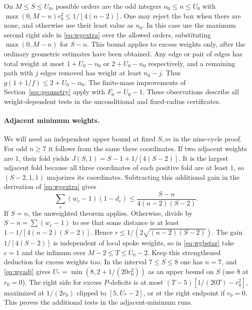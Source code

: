 \documentclass[11pt,a4paper]{article}
\theoremstyle{definition}
\begin{document}
On $M\le S\le U_0$, possible orders are the odd integers
$n_0\le n\le U_0$ with
$\max(0,M-n)r_0^2\le1/[4(n-2)]$. One may reject the box when
there are none, and otherwise use their least value as $n_0$.
In this case use the maximum second right side in \eqref{eq:wgextra}
over the allowed orders, substituting $\max(0,M-n)$ for $S-n$.
This bound applies to excess weights only, after the ordinary
geometric estimates have been obtained. Any edge or pair of edges
has total weight at most $1+U_0-n_0$ or $2+U_0-n_0$ respectively,
and a remaining path with $j$ edges removed has weight at least
$n_0-j$. Thus $g(1+1/f)\le 2+U_0-n_0$. The finite-mass
improvements of Section~\ref{sec:geometry} apply with $F_0=U_0-1$.
These observations describe all weight-dependent tests in the
unconditional and fixed-radius certificates.

\paragraph{Adjacent minimum weights.}
We will need an independent upper bound at fixed $S,m$ in the
nine-cycle proof. For odd $n\ge7$ it follows from the same three
coordinates. If two adjacent weights are $1$, their fold yields
$J(S,1)=S-1+1/[4(S-2)]$. It is the largest adjacent fold because
all three coordinates of each positive fold are at least $1$,
so $(S-2,1,1)$ majorizes its coordinates. Subtracting this additional
gain in the derivation of \eqref{eq:wgextra} gives
\begin{equation}
 \sum_e(w_e-1)(1-d_e)\le
 \frac{S-n}{4(n-2)(S-2)}.\label{eq:wgadj}
\end{equation}
If $S=n$, the unweighted theorem applies. Otherwise, divide by
$S-n=\sum(w_e-1)$ to see that some distance is at least
$1-1/[4(n-2)(S-2)]$. Hence $r\le1/(2\sqrt{(n-2)(S-2)})$.
The gain $1/[4(S-2)]$ is independent of local spoke weights, so in
\eqref{eq:wgbstar} take $c=1$ and the infimum over
$M-2\le T\le U_0-2$. Keep this strengthened deduction for excess
weights too. In the interval $7\le S\le8$ one has $n=7$, and
\eqref{eq:wgadj} gives $U_*=\min(8,2+1/(20r_0^2))$ as an upper
bound on $S$ (use $8$ at $r_0=0$). The right side for excess
$P$-deficits is at most
$(T-5)[1/(20T)-r_0^2]$, maximized at $1/(2r_0)$ clipped to
$[5,U_*-2]$, or at the right endpoint if $r_0=0$.
This proves the additional tests in the adjacent-minimum runs.
\end{document}
